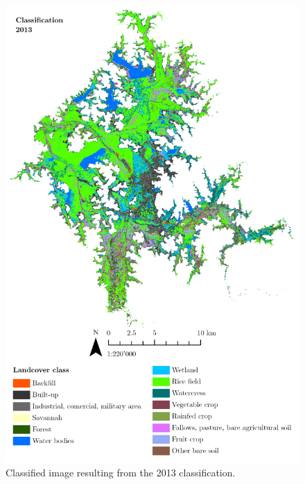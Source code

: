 \begin{figure}[H]
    \centering
    \includegraphics[width = 15cm]{figures/classi2013.png}
    \caption{Classified image resulting from the 2013 classification.}
    \label{}
\end{figure}

